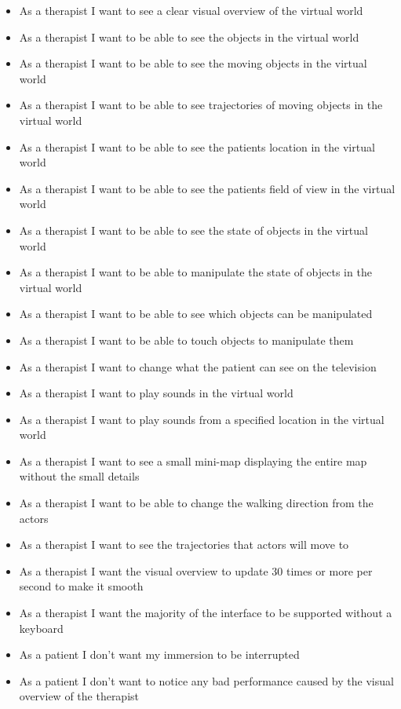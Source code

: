 \documentclass[11pt]{article}
\begin{document}
    \begin{itemize}
		\item As a therapist I want to see a clear visual overview of the virtual world
        \item As a therapist I want to be able to see the objects in the virtual world
        \item As a therapist I want to be able to see the moving objects in the virtual world
        \item As a therapist I want to be able to see trajectories of moving objects in the virtual world
        \item As a therapist I want to be able to see the patients location in the virtual world
        \item As a therapist I want to be able to see the patients field of view in the virtual world
        \item As a therapist I want to be able to see the state of objects in the virtual world
        \item As a therapist I want to be able to manipulate the state of objects in the virtual world
        \item As a therapist I want to be able to see which objects can be manipulated
        \item As a therapist I want to be able to touch objects to manipulate them
        \item As a therapist I want to change what the patient can see on the television
        \item As a therapist I want to play sounds in the virtual world
        \item As a therapist I want to play sounds from a specified location in the virtual world
        \item As a therapist I want to see a small mini-map displaying the entire map without the small details
        \item As a therapist I want to be able to change the walking direction from the actors
        \item As a therapist I want to see the trajectories that actors will move to
        \item As a therapist I want the visual overview to update 30 times or more per second to make it smooth
        \item As a therapist I want the majority of the interface to be supported without a keyboard
		\item As a patient I don't want my immersion to be interrupted
        \item As a patient I don't want to notice any bad performance caused by the visual overview of the therapist

\end{itemize}
\end{document}
